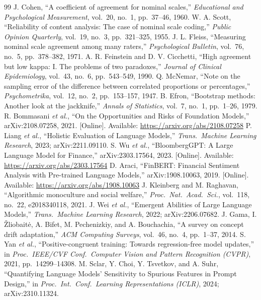 \documentclass[11pt]{article}
\begin{document}
\begin{thebibliography}{99}
 J. Cohen, ``A coefficient of agreement for nominal scales,'' \emph{Educational and Psychological Measurement}, vol.~20, no.~1, pp.~37--46, 1960.
 W. A. Scott, ``Reliability of content analysis: The case of nominal scale coding,'' \emph{Public Opinion Quarterly}, vol.~19, no.~3, pp.~321--325, 1955.
 J. L. Fleiss, ``Measuring nominal scale agreement among many raters,'' \emph{Psychological Bulletin}, vol.~76, no.~5, pp.~378--382, 1971.
 A. R. Feinstein and D. V. Cicchetti, ``High agreement but low kappa: I. The problems of two paradoxes,'' \emph{Journal of Clinical Epidemiology}, vol.~43, no.~6, pp.~543--549, 1990.
 Q. McNemar, ``Note on the sampling error of the difference between correlated proportions or percentages,'' \emph{Psychometrika}, vol.~12, no.~2, pp.~153--157, 1947.
 B. Efron, ``Bootstrap methods: Another look at the jackknife,'' \emph{Annals of Statistics}, vol.~7, no.~1, pp.~1--26, 1979.
 R. Bommasani \emph{et al.}, ``On the Opportunities and Risks of Foundation Models,'' arXiv:2108.07258, 2021. [Online]. Available: \url{https://arxiv.org/abs/2108.07258}
 P. Liang \emph{et al.}, ``Holistic Evaluation of Language Models,'' \emph{Trans.\ Machine Learning Research}, 2023; arXiv:2211.09110.
 S. Wu \emph{et al.}, ``BloombergGPT: A Large Language Model for Finance,'' arXiv:2303.17564, 2023. [Online]. Available: \url{https://arxiv.org/abs/2303.17564}
 D. Araci, ``FinBERT: Financial Sentiment Analysis with Pre-trained Language Models,'' arXiv:1908.10063, 2019. [Online]. Available: \url{https://arxiv.org/abs/1908.10063}
 J. Kleinberg and M. Raghavan, ``Algorithmic monoculture and social welfare,'' \emph{Proc.\ Nat.\ Acad.\ Sci.}, vol.~118, no.~22, e2018340118, 2021.
 J. Wei \emph{et al.}, ``Emergent Abilities of Large Language Models,'' \emph{Trans.\ Machine Learning Research}, 2022; arXiv:2206.07682.
 J. Gama, I. \v{Z}liobait\.{e}, A. Bifet, M. Pechenizkiy, and A. Bouchachia, ``A survey on concept drift adaptation,'' \emph{ACM Computing Surveys}, vol.~46, no.~4, pp.~1--37, 2014.
 S. Yan \emph{et al.}, ``Positive-congruent training: Towards regression-free model updates,'' in \emph{Proc.\ IEEE/CVF Conf.\ Computer Vision and Pattern Recognition (CVPR)}, 2021, pp.~14299--14308.
 M. Sclar, Y. Choi, Y. Tsvetkov, and A. Suhr, ``Quantifying Language Models' Sensitivity to Spurious Features in Prompt Design,'' in \emph{Proc.\ Int.\ Conf.\ Learning Representations (ICLR)}, 2024; arXiv:2310.11324.

\end{thebibliography}
\end{document}
